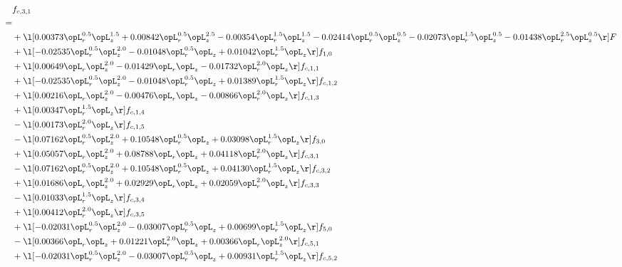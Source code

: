 \begin{alignat}{2} 
\label{eq:f_31_1} 
& f_{c,3,1} \nonumber \\ 
 = \\ 
& + \l[  0.00373 \opL_r^{0.5} \opL_z^{1.5} +  0.00842 \opL_r^{0.5} \opL_z^{2.5}   -0.00354 \opL_r^{1.5} \opL_z^{1.5}   -0.02414 \opL_r^{0.5} \opL_z^{0.5}   -0.02073 \opL_r^{1.5} \opL_z^{0.5}   -0.01438 \opL_r^{2.5} \opL_z^{0.5}  \r] F \nonumber \\ 
& + \l[  -0.02535 \opL_r^{0.5} \opL_z^{2.0}   -0.01048 \opL_r^{0.5} \opL_z +  0.01042 \opL_r^{1.5} \opL_z  \r] f_{1,0} \nonumber \\ 
& + \l[  0.00649 \opL_r \opL_z^{2.0}   -0.01429 \opL_r \opL_z   -0.01732 \opL_r^{2.0} \opL_z  \r] f_{c,1,1} \nonumber \\ 
& + \l[  -0.02535 \opL_r^{0.5} \opL_z^{2.0}   -0.01048 \opL_r^{0.5} \opL_z +  0.01389 \opL_r^{1.5} \opL_z  \r] f_{c,1,2} \nonumber \\ 
& + \l[  0.00216 \opL_r \opL_z^{2.0}   -0.00476 \opL_r \opL_z   -0.00866 \opL_r^{2.0} \opL_z  \r] f_{c,1,3} \nonumber \\ 
& + \l[  0.00347 \opL_r^{1.5} \opL_z  \r] f_{c,1,4} \nonumber \\ 
& - \l[  0.00173 \opL_r^{2.0} \opL_z  \r] f_{c,1,5} \nonumber \\ 
& - \l[  0.07162 \opL_r^{0.5} \opL_z^{2.0} +  0.10548 \opL_r^{0.5} \opL_z +  0.03098 \opL_r^{1.5} \opL_z  \r] f_{3,0} \nonumber \\ 
& + \l[  0.05057 \opL_r \opL_z^{2.0} +  0.08788 \opL_r \opL_z +  0.04118 \opL_r^{2.0} \opL_z  \r] f_{c,3,1} \nonumber \\ 
& - \l[  0.07162 \opL_r^{0.5} \opL_z^{2.0} +  0.10548 \opL_r^{0.5} \opL_z +  0.04130 \opL_r^{1.5} \opL_z  \r] f_{c,3,2} \nonumber \\ 
& + \l[  0.01686 \opL_r \opL_z^{2.0} +  0.02929 \opL_r \opL_z +  0.02059 \opL_r^{2.0} \opL_z  \r] f_{c,3,3} \nonumber \\ 
& - \l[  0.01033 \opL_r^{1.5} \opL_z  \r] f_{c,3,4} \nonumber \\ 
& + \l[  0.00412 \opL_r^{2.0} \opL_z  \r] f_{c,3,5} \nonumber \\ 
& + \l[  -0.02031 \opL_r^{0.5} \opL_z^{2.0}   -0.03007 \opL_r^{0.5} \opL_z +  0.00699 \opL_r^{1.5} \opL_z  \r] f_{5,0} \nonumber \\ 
& - \l[  0.00366 \opL_r \opL_z +  0.01221 \opL_r^{2.0} \opL_z +  0.00366 \opL_r \opL_z^{2.0}  \r] f_{c,5,1} \nonumber \\ 
& + \l[  -0.02031 \opL_r^{0.5} \opL_z^{2.0}   -0.03007 \opL_r^{0.5} \opL_z +  0.00931 \opL_r^{1.5} \opL_z  \r] f_{c,5,2} \nonumber \\ 

\end{alignat}
